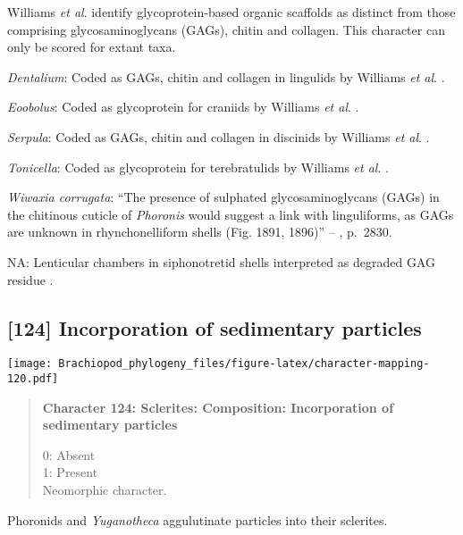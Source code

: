 \documentclass[openany]{book}
\theoremstyle{definition}
\theoremstyle{definition}
\theoremstyle{definition}
\theoremstyle{remark}
\begin{document}
Williams \emph{et al}. \citeyearpar{Williams1996Asupra} identify
glycoprotein-based organic scaffolds as distinct from those comprising
glycosaminoglycans (GAGs), chitin and collagen. This character can only
be scored for extant taxa.

\hypertarget{Dentalium-coding-123}{}
\emph{Dentalium}: Coded as GAGs, chitin and collagen in lingulids by
Williams \emph{et al}. \citeyearpar{Williams1996Asupra}.

\hypertarget{Eoobolus-coding-123}{}
\emph{Eoobolus}: Coded as glycoprotein for craniids by Williams \emph{et
al}. \citeyearpar{Williams1996Asupra}.

\hypertarget{Serpula-coding-123}{}
\emph{Serpula}: Coded as GAGs, chitin and collagen in discinids by
Williams \emph{et al}. \citeyearpar{Williams1996Asupra}.

\hypertarget{Tonicella-coding-123}{}
\emph{Tonicella}: Coded as glycoprotein for terebratulids by Williams
\emph{et al}. \citeyearpar{Williams1996Asupra}.

\hypertarget{Wiwaxia_corrugata-coding-123}{}
\emph{Wiwaxia corrugata}: ``The presence of sulphated glycosaminoglycans
(GAGs) in the chitinous cuticle of \emph{Phoronis}
\citep[p.~215]{Herrmann1997Phoronida} would suggest a link with
linguliforms, as GAGs are unknown in rhynchonelliform shells (Fig. 1891,
1896)'' -- \citet{Williams2007Supplement}, p.~2830.

\hypertarget{NA-coding-123}{}
NA: Lenticular chambers in siphonotretid shells interpreted as degraded
GAG residue \citep{Williams2004Chemicostructure}.

\subsection*{{[}124{]} Incorporation of sedimentary
particles}\label{incorporation-of-sedimentary-particles}

\texttt{[image: Brachiopod\_phylogeny\_files/figure-latex/character-mapping-120.pdf]}

\begin{quote}
\textbf{Character 124: Sclerites: Composition: Incorporation of
sedimentary particles}

0: Absent\\
1: Present\\
Neomorphic character.
\end{quote}

Phoronids and \emph{Yuganotheca} aggulutinate particles into their
sclerites.
\end{document}
